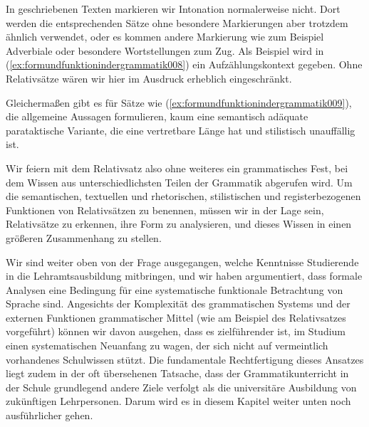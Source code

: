 \begin{exe}
\end{exe}

In geschriebenen Texten markieren wir Intonation normalerweise nicht.
Dort werden die entsprechenden Sätze ohne besondere Markierungen aber trotzdem ähnlich verwendet, oder es kommen andere Markierung wie zum Beispiel Adverbiale oder besondere Wortstellungen zum Zug.
Als Beispiel wird in (\ref{ex:formundfunktionindergrammatik008}) ein Aufzählungskontext gegeben.
Ohne Relativsätze wären wir hier im Ausdruck erheblich eingeschränkt.

\begin{exe}
\end{exe}

Gleichermaßen gibt es für Sätze wie (\ref{ex:formundfunktionindergrammatik009}), die allgemeine Aussagen formulieren, kaum eine semantisch adäquate parataktische Variante, die eine vertretbare Länge hat und stilistisch unauffällig ist.

\begin{exe}
\end{exe}

Wir feiern mit dem Relativsatz also ohne weiteres ein grammatisches Fest, bei dem Wissen aus unterschiedlichsten Teilen der Grammatik abgerufen wird.
Um die semantischen, textuellen und rhetorischen, stilistischen und registerbezogenen Funktionen von Relativsätzen zu benennen, müssen wir in der Lage sein, Relativsätze zu erkennen, ihre Form zu analysieren, und dieses Wissen in einen größeren Zusammenhang zu stellen.

Wir sind weiter oben von der Frage ausgegangen, welche Kenntnisse Studierende in die Lehramtsausbildung mitbringen, und wir haben argumentiert, dass formale Analysen eine Bedingung für eine systematische funktionale Betrachtung von Sprache sind.
Angesichts der Komplexität des grammatischen Systems und der externen Funktionen grammatischer Mittel (wie am Beispiel des Relativsatzes vorgeführt) können wir davon ausgehen, dass es zielführender ist, im Studium einen systematischen Neuanfang zu wagen, der sich nicht auf vermeintlich vorhandenes Schulwissen stützt.
Die fundamentale Rechtfertigung dieses Ansatzes liegt zudem in der oft übersehenen Tatsache, dass der Grammatikunterricht in der Schule grundlegend andere Ziele verfolgt als die universitäre Ausbildung von zukünftigen Lehrpersonen.
Darum wird es in diesem Kapitel weiter unten noch ausführlicher gehen.

